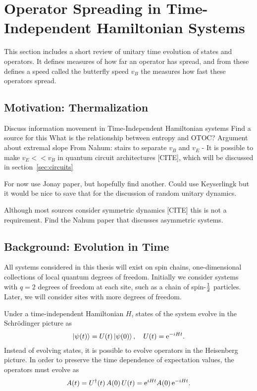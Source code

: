 \section{Operator Spreading in Time-Independent Hamiltonian Systems} \label{sec:opsp}

This section includes a short review of unitary time evolution of states and operators. It defines measures of how far an operator has spread, and from these defines a speed called the butterfly speed $v_B$ the measures how fast these operators spread.

\subsection{Motivation: Thermalization} \label{sub:therm}

Discuss information movement in Time-Independent Hamiltonian systems
  Find a source for this
  What is the relationship between entropy and OTOC?
  Argument about extremal slope
    From Nahum: stairs to separate $v_B$ and $v_E$ - It is possible to make $v_E << v_B$ in quantum circuit architectures [CITE], which will be discussed in section~\ref{sec:circuits}
    
For now use Jonay paper, but hopefully find another. Could use Keyserlingk but it would be nice to save that for the discussion of random unitary dynamics.

Although most sources consider symmetric dynamics [CITE] this is not a requirement. Find the Nahum paper that discusses asymmetric systems.

\subsection{Background: Evolution in Time} \label{sub:evoltime}

All systems considered in this thesis will exist on spin chains, one-dimensional collections of  local quantum degrees of freedom. Initially we consider systems with $q=2$ degrees of freedom at each site, such as a chain of spin-$\frac{1}{2}$ particles. Later, we will consider sites with more degrees of freedom. 

Under a time-independent Hamiltonian $H$, states of the system evolve in the Schr\"odinger picture as 
\begin{align}
\left|\psi(t)\right\rangle = U(t)\left|\psi(0)\right\rangle,\quad U(t) = \text{e}^{-iHt}. \label{eqn:shro}
\end{align}
Instead of evolving states, it is possible to evolve operators in the Heisenberg picture. In order to preserve the time dependence of expectation values, the operators must evolve as 
\begin{align}
A(t) = U^\dag(t)\,A(0)\,U(t) = \text{e}^{iHt}A(0)\,\text{e}^{-iHt}.\label{eqn:heis}
\end{align}

